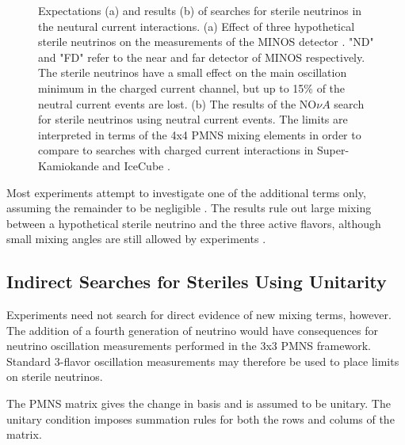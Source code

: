 \begin{figure}[!h]%
        \centering
\caption{Expectations (a) and results (b) of searches for sterile neutrinos in the neutural current interactions. (a) Effect of three hypothetical sterile neutrinos on the measurements of the MINOS detector \cite{MINOS-SterileNC-2016}. "ND" and "FD" refer to the near and far detector of MINOS respectively. The sterile neutrinos have a small effect on the main oscillation minimum in the charged current channel, but up to 15\% of the neutral current events are lost. (b) The results of the NO${\nu}A$ search for sterile neutrinos using neutral current events. The limits are interpreted in terms of the 4x4 PMNS mixing elements in order to compare to searches with charged current interactions in Super-Kamiokande \cite{SuperK-Steriles2015} and IceCube \cite{IceCubeSterile-Andrii}. }
\end{figure}

Most experiments attempt to investigate one of the additional terms only, assuming the remainder to be negligible \cite{SuperK-Steriles2015, IceCubeSterile-Andrii, IceCubeSterile-IC86-1}. 
The results rule out large mixing between a hypothetical sterile neutrino and the three active flavors, although small mixing angles are still allowed by experiments \cite{GlobalSteriles-2017, Review-LightSterile}.

\label{subsec:steriles_unitarity}
\subsection{Indirect Searches for Steriles Using Unitarity}
Experiments need not search for direct evidence of new mixing terms, however.
The addition of a fourth generation of neutrino would have consequences for neutrino oscillation measurements performed in the 3x3 PMNS framework.
Standard 3-flavor oscillation measurements may therefore be used to place limits on sterile neutrinos.

The PMNS matrix gives the change in basis and is assumed to be unitary.
The unitary condition imposes summation rules for both the rows and colums of the matrix.

